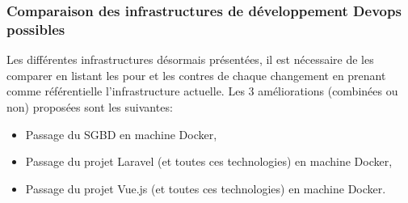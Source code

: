 \documentclass[
    iai, %
    il, %
]{heig-tb}
\begin{document}

\subsubsection{Comparaison des infrastructures de développement Devops possibles}
Les différentes infrastructures désormais présentées, il est nécessaire de les comparer en listant les pour et les contres de chaque changement en prenant comme référentielle l'infrastructure actuelle.
Les 3 améliorations (combinées ou non) proposées sont les suivantes:
\begin{itemize}
    \item Passage du SGBD en machine Docker,
    \item Passage du projet Laravel (et toutes ces technologies) en machine Docker,
    \item Passage du projet Vue.js (et toutes ces technologies) en machine Docker.
\end{itemize}
\end{document}
